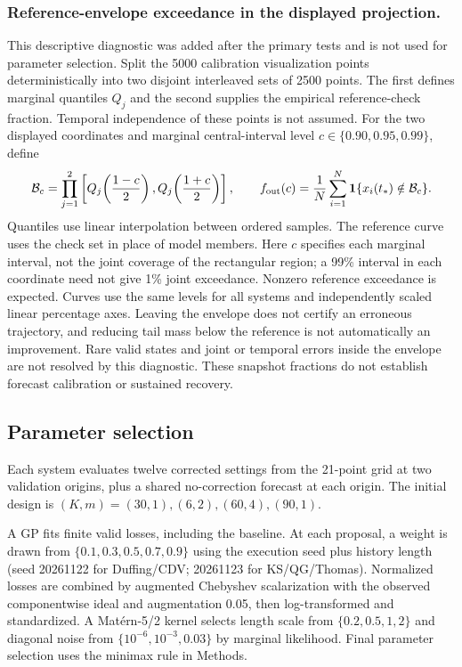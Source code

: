 \documentclass[gmd,manuscript]{copernicus}
\begin{document}
\subsubsection{Reference-envelope exceedance in the displayed projection.}
This descriptive diagnostic was added after the primary tests and is not used for parameter selection. Split the 5000 calibration visualization points deterministically into two disjoint interleaved sets of 2500 points. The first defines marginal quantiles $Q_j$ and the second supplies the empirical reference-check fraction. Temporal independence of these points is not assumed. For the two displayed coordinates and marginal central-interval level $c\in\{0.90,0.95,0.99\}$, define
\begin{equation}
\mathcal B_c=\prod_{j=1}^2\left[Q_j\!\left(\frac{1-c}{2}\right),Q_j\!\left(\frac{1+c}{2}\right)\right],\qquad
f_{\rm out}(c)=\frac1N\sum_{i=1}^N\mathbf1\{x_i(t_*)\notin\mathcal B_c\}.
\end{equation}
Quantiles use linear interpolation between ordered samples. The reference curve uses the check set in place of model members. Here $c$ specifies each marginal interval, not the joint coverage of the rectangular region; a 99\% interval in each coordinate need not give 1\% joint exceedance. Nonzero reference exceedance is expected. Curves use the same levels for all systems and independently scaled linear percentage axes. Leaving the envelope does not certify an erroneous trajectory, and reducing tail mass below the reference is not automatically an improvement. Rare valid states and joint or temporal errors inside the envelope are not resolved by this diagnostic. These snapshot fractions do not establish forecast calibration or sustained recovery.

\subsection{Parameter selection}\label{app:note4}
Each system evaluates twelve corrected settings from the 21-point grid at two validation origins, plus a shared no-correction forecast at each origin. The initial design is $(K,m)=(30,1),(6,2),(60,4),(90,1)$.

A GP fits finite valid losses, including the baseline. At each proposal, a weight is drawn from $\{0.1,0.3,0.5,0.7,0.9\}$ using the execution seed plus history length (seed 20261122 for Duffing/CDV; 20261123 for KS/QG/Thomas). Normalized losses are combined by augmented Chebyshev scalarization with the observed componentwise ideal and augmentation 0.05, then log-transformed and standardized. A Mat\'ern-5/2 kernel selects length scale from $\{0.2,0.5,1,2\}$ and diagonal noise from $\{10^{-6},10^{-3},0.03\}$ by marginal likelihood. Final parameter selection uses the minimax rule in Methods.
\end{document}
